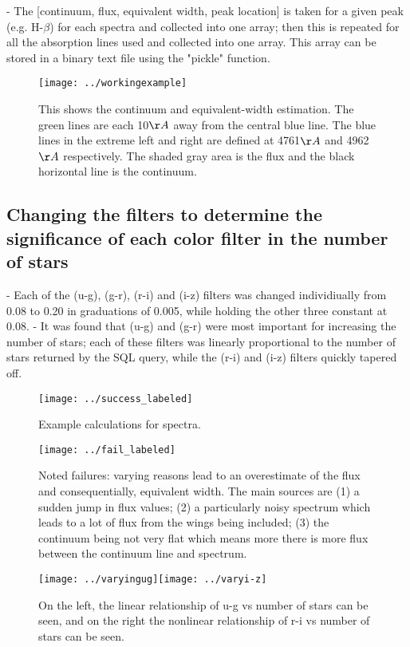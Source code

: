 \documentclass[12pt]{article}
\begin{document}
- The [continuum, flux, equivalent width, peak location] is taken for a given peak (e.g. H-$\beta$) for each spectra and collected into one array; then this is repeated for all the absorption lines used and collected into one array. This array can be stored in a binary text file using the "pickle" function. \\
\begin{figure}
\texttt{[image: ../workingexample]}\\
\caption{This shows the continuum and equivalent-width estimation. The green lines are each 10$\AA$  away from the central blue line. The blue lines in the extreme left and right are defined at 4761$\AA$ and 4962$\AA$  respectively. The shaded gray area is the flux and the black horizontal line is the continuum.}
\end{figure}
\subsection{Changing the filters to determine the significance of each color filter in the number of stars}
- Each of the (u-g), (g-r), (r-i) and (i-z) filters was changed individiually from 0.08 to 0.20 in graduations of 0.005, while holding the other three constant at 0.08. 
- It was found that (u-g) and (g-r) were most important for increasing the number of stars; each of these filters was linearly proportional to the number of stars returned by the SQL query, while the (r-i) and (i-z) filters quickly tapered off. 

\begin{figure}
\texttt{[image: ../success\_labeled]}\\
\caption{Example calculations for spectra.}
\end{figure}

\begin{figure}
\texttt{[image: ../fail\_labeled]}\\
\caption{Noted failures: varying reasons lead to an overestimate of the flux and consequentially, equivalent width. The main sources are (1) a sudden jump in flux values; (2) a particularly noisy spectrum which leads to a lot of flux from the wings being included; (3) the continuum being not very flat which means more there is more flux between the continuum line and spectrum.}
\end{figure}
\begin{figure}
\texttt{[image: ../varyingug]}\texttt{[image: ../varyi-z]}\\
\caption{ On the left, the linear relationship of u-g vs number of stars can be seen, and on the right the nonlinear relationship of r-i vs number of stars can be seen.}
\end{figure}
\end{document}
